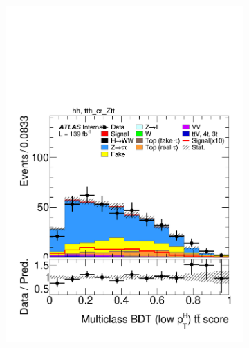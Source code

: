 \begin{figure}[h]
\begin{subfigure}[b]{0.32\textwidth}
    \includegraphics[width=\textwidth]{images/sr_cr_plots/plot_tth_ttbar_multiclass_lt200_hh_tth_cr_Ztt.pdf}
    \caption{}
  \end{subfigure}
  \begin{subfigure}[b]{0.32\textwidth}

\end{subfigure}
\end{figure}
